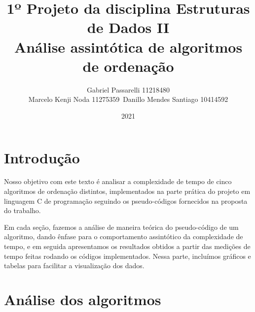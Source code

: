 \documentclass{article}
\title{%
    1º Projeto da disciplina Estruturas de Dados II \\
     \large Análise assintótica de algoritmos de ordenação}
\author{Gabriel Passarelli 11218480\\ Marcelo Kenji Noda 11275359\ Danillo Mendes Santiago 10414592}
\date{2021}
\begin{document}
%
\maketitle
%
\newpage
\section{Introdução}
Nosso objetivo com este texto é analisar a complexidade de tempo de cinco algoritmos de ordenação distintos, implementados na parte prática do projeto em linguagem C de programação seguindo os pseudo-códigos fornecidos na proposta do trabalho.\par
%
Em cada seção, fazemos a análise de maneira teórica do pseudo-código de um algoritmo, dando ênfase para o comportamento assintótico da complexidade de tempo, e em seguida apresentamos os resultados obtidos a partir das medições de tempo feitas rodando os códigos implementados. Nessa parte, incluímos gráficos e tabelas para facilitar a visualização dos dados.
%
\section{Análise dos algoritmos}
\end{document}
